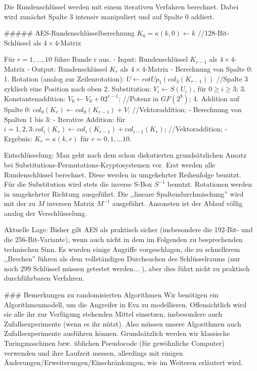 \documentclass[a4paper]{article}
\begin{document}
\begin{multicols}{3}
        Die Rundenschlüssel werden mit einem iterativen Verfahren berechnet. Dabei wird zunächst Spalte 3 intensiv manipuliert und auf Spalte 0 addiert.

        ##### AES-Rundenschlüsselberechnung
    $K_0 =\kappa (k,0)\leftarrow k$ //128-Bit-Schlüssel als $4\times 4$-Matrix

        Für $r= 1,..., 10$ führe Runde r aus.
        - Input: Rundenschlüssel $K_{r-1}$ als $4\times 4$-Matrix
        - Output: Rundenschlüssel $K_r$ als $4\times 4$-Matrix
        - Berechnung von Spalte 0:
        1. Rotation (analog zur Zeilenrotation): $U\leftarrow rotUp_1(col_3(K_{r-1}))$ //Spalte 3 zyklisch eine Position nach oben
        2. Substitution: $V_i\leftarrow S(U_i)$, für $0\geq i\geq 3$;
        3. Konstantenaddition: $V_0\leftarrow V_0+02^{r-1}$; //Potenz in $GF(2^8)$;
        4. Addition auf Spalte 0: $col_0(K_r)\leftarrow col_0(K_{r-1})+V$; //Vektoraddition;
        - Berechnung von Spalten 1 bis 3:
        - Iterative Addition: für $i=1,2,3: col_i(K_r)\leftarrow col_i(K_{r-1})+col_{i-1}(K_r)$; //Vektoraddition;
        - Ergebnis: $K_r=\kappa (k,r)$ für $r=0,1,...10$.

        Entschlüsselung:
        Man geht nach dem schon diskutierten grundsätzlichen Ansatz bei Substitutions-Permutations-Kryptosystemen vor. Erst werden alle Rundenschlüssel berechnet. Diese werden in umgekehrter Reihenfolge benutzt. Für die Substitution wird stets die inverse S-Box $S^{-1}$ benutzt. Rotationen werden in umgekehrter Richtung ausgeführt. Die ,,lineare Spaltendurchmischung'' wird mit der zu $M$ inversen Matrix $M^{-1}$ ausgeführt. Ansonsten ist der Ablauf völlig analog der Verschlüsselung.

        Aktuelle Lage:
        Bisher gilt AES als praktisch sicher (insbesondere die 192-Bit- und die 256-Bit-Variante), wenn auch nicht in dem im Folgenden zu besprechenden technischen Sinn. Es wurden einige Angriffe vorgeschlagen, die zu schnellerem ,,Brechen'' führen als dem vollständigen Durchsuchen des Schlüsselraums (nur noch 299 Schlüssel müssen getestet werden... ), aber dies führt nicht zu praktisch durchführbaren Verfahren.

        ### Bemerkungen zu randomisierten Algorithmen
        Wir benötigen ein Algorithmenmodell, um die Angreifer in Eva zu modellieren. Offensichtlich wird sie alle ihr zur Verfügung stehenden Mittel einsetzen, insbesondere auch Zufallsexperimente (wenn es ihr nützt). Also müssen unsere Algorithmen auch Zufallsexperimente ausführen können. Grundsätzlich werden wir klassische Turingmaschinen bzw. üblichen Pseudocode (für gewöhnliche Computer) verwenden und ihre Laufzeit messen, allerdings mit einigen Änderungen/Erweiterungen/Einschränkungen, wie im Weiteren erläutert wird.


\end{multicols}
\end{document}
